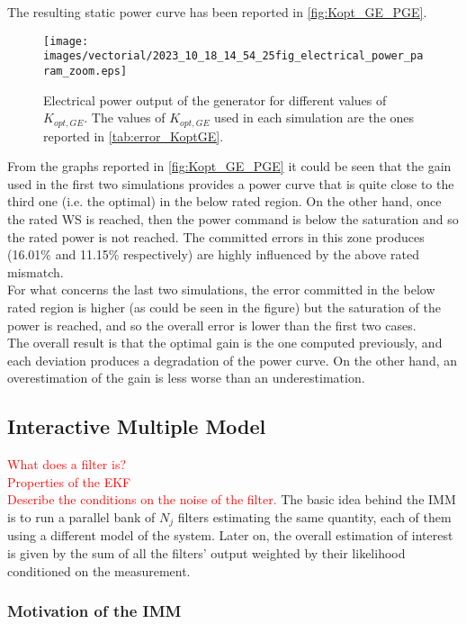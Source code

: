 The resulting static power curve has been reported in \autoref{fig:Kopt_GE_PGE}.
\begin{figure}
  \centering
  \texttt{[image: images/vectorial/2023\_10\_18\_14\_54\_25fig\_electrical\_power\_param\_zoom.eps]}
  \caption{Electrical power output of the generator for different values of $K_{opt,GE}$. The values of $K_{opt,GE}$ used in each simulation are the ones reported in \autoref{tab:error_KoptGE}.}
  \label{fig:Kopt_GE_PGE}
\end{figure}

From the graphs reported in \autoref{fig:Kopt_GE_PGE} it could be seen that the gain used in the first two simulations provides a power curve that is quite close to the third one (i.e. the optimal) in the below rated region. On the other hand, once the rated WS is reached, then the power command is below the saturation and so the rated power is not reached. The committed errors in this zone produces (16.01\% and 11.15\% respectively) are highly influenced by the above rated mismatch. \\
For what concerns the last two simulations, the error committed in the below rated region is higher (as could be seen in the figure) but the saturation of the power is reached, and so the overall error is lower than the first two cases. \\
The overall result is that the optimal gain is the one computed previously, and each deviation produces a degradation of the power curve. On the other hand, an overestimation of the gain is less worse than an underestimation.\\

\subsection{Interactive Multiple Model}\label{subsec:IMM}
\textcolor{red}{What does a filter is? }\\
\textcolor{red}{Properties of the EKF}\\
\textcolor{red}{Describe the conditions on the noise of the filter.}
The basic idea behind the IMM is to run a parallel bank of $N_j$ filters estimating the same quantity, each of them using a different model of the system. Later on, the overall estimation of interest is given by the sum of all the filters' output weighted by their likelihood conditioned on the measurement. \\
\subsubsection{Motivation of the IMM}
